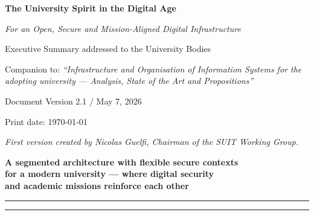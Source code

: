 \documentclass[12pt,a4paper]{article}
\newcommand{\genericroot}{../../..}
\newcommand{\compsrc}{\genericroot/suit-policy/companion}%
\begin{document}
\begin{center}
\vspace*{-0.2cm}
{\Large\bfseries The University Spirit in the Digital Age}
\par\smallskip
{\normalsize\itshape For an Open, Secure and Mission-Aligned Digital Infrastructure}
\par\smallskip
{\small Executive Summary addressed to the University Bodies}
\par\smallskip
{\scriptsize Companion to: \emph{``Infrastructure and Organisation of Information Systems
for the adopting university --- Analysis, State of the Art and Propositions''}}
\par\smallskip
{\small Document Version 2.1 / May 7, 2026}
\par\smallskip
{\small Print date: \today}
\par\smallskip
{\footnotesize\itshape First version created by Nicolas Guelfi, Chairman of the SUIT Working Group.}
\par\medskip
\begin{tcolorbox}[colback=NavyBlue!8!white,colframe=NavyBlue!85!black,boxrule=1.2pt,
    arc=3pt,left=10pt,right=10pt,top=8pt,bottom=8pt,halign=center]
{\normalsize\bfseries A segmented architecture with flexible secure contexts\\[3pt]
for a modern university --- where digital security\\[3pt]
and academic missions reinforce each other}
\end{tcolorbox}
\end{center}

\smallskip
{}

\smallskip
\noindent\rule{\textwidth}{0.6pt}



\vspace{1em}
\noindent\rule{\textwidth}{0.4pt}
\printbibliography[title={\normalsize References}]

\printabstractappendix
\end{document}
